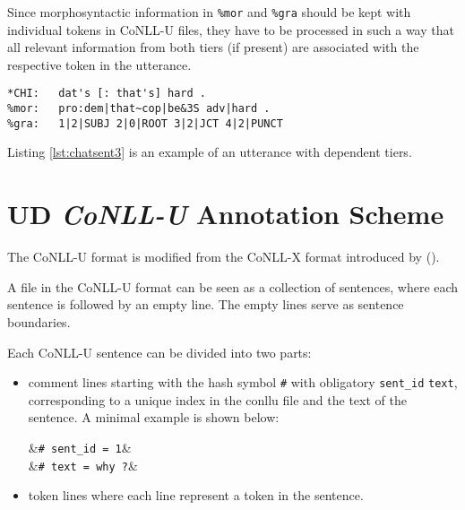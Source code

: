 Since morphosyntactic information in \texttt{\%mor} and \texttt{\%gra} should be kept with individual tokens in CoNLL-U files, they have to be processed in such a way that all relevant information from both tiers (if present) are associated with the respective token in the utterance.\\

\begin{lstlisting}[caption={Excerpt from Adam/040217.cha of the Brown Corpus (\cite{brown1973})}, label={lst:chatsent3}]
*CHI:	dat's [: that's] hard .
%mor:	pro:dem|that~cop|be&3S adv|hard .
%gra:	1|2|SUBJ 2|0|ROOT 3|2|JCT 4|2|PUNCT
\end{lstlisting}

Listing \ref{lst:chatsent3} is an example of an utterance with dependent tiers.\\


\newcommand{\conllu}[1]{&\footnotesize\texttt{#1}}
\newcommand{\tab}{&\hspace{0.1em}}
\setlength{\abovedisplayskip}{3pt}
\setlength{\belowdisplayskip}{3pt}

\section{UD \emph{CoNLL-U} Annotation Scheme}

The CoNLL-U format is modified from the CoNLL-X format introduced by (\cite{buchholz-marsi-2006-conll}).

A file in the CoNLL-U format can be seen as a collection of sentences, where each sentence is followed by an empty line. The empty lines serve as sentence boundaries.

Each CoNLL-U sentence can be divided into two parts:
\begin{itemize}
	\item comment lines  starting with the hash symbol \texttt{\#} with obligatory \texttt{sent\_id} \texttt{text}, corresponding to a unique index in the conllu file and the text of the sentence. A minimal example is shown below:
	\begin{flalign*}
	\conllu{\# sent\_id = 1}&\\
	\conllu{\# text = why ?}&
	\end{flalign*}
	\item token lines where each line represent a token in the sentence.
\end{itemize}
